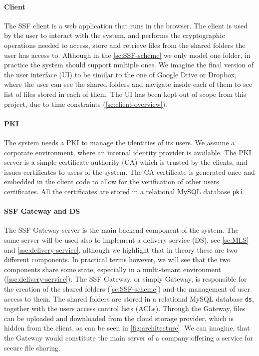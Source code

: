 \paragraph{Client} The SSF client is a web application that
runs in the browser. The client is used by the user to
interact with the system, and performs the cryptographic
operations needed to access, store and retrieve files 
from the shared folders the user has access to.
Although in the \cref{sc:SSF-scheme} we only model one folder,
in practice the system should support multiple ones.
We imagine the final version of the user interface (UI) to
be similar to the one of Google Drive or Dropbox, where
the user can see the shared folders and navigate inside each
of them to see list of files stored in each of them.
The UI has been kept out of scope from this project, due to
time constraints (\cref{sc:client-overview}).

\paragraph{PKI} The system needs a PKI to manage the identities
of its users. We assume a corporate environment, where
an internal identity provider is available. The PKI server
is a simple certificate authority (CA) which is trusted
by the clients, and issues certificates to users of the system.
The CA certificate is generated once and embedded in the client
code to allow for the verification of other users certificates.
All the certificates are stored in a relational MySQL database \texttt{pki}.

\paragraph{SSF Gateway and DS}
The SSF Gateway server is the main backend component of the system.
The same server will be used also to implement a delivery service (DS), see \cref{sc:MLS} and \cref{ssc:delivery-service}, although
we highlight that in theory these are two different components.
In practical terms however, we will see that the two components
share some state, especially in a multi-tenant environment (\cref{ssc:delivery-service}).
The SSF Gateway, or simply Gateway, is responsible for the
creation of the shared folders (\cref{sc:SSF-scheme}) and the management of user access
to them. The shared folders are stored in a relational MySQL
database \texttt{ds}, together with the users access control lists (ACLs).
Through the Gateway, files can be uploaded and downloaded 
from the cloud storage provider, which is hidden from the client,
as can be seen in \cref{fig:architecture}.
We can imagine, that the Gateway would constitute the main
server of a company offering a service for secure file sharing.

